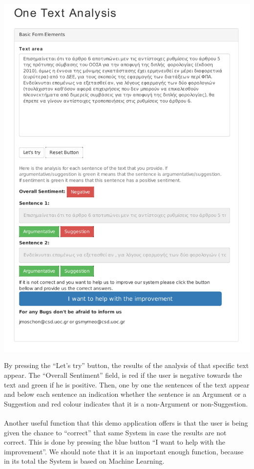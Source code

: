 \centerline{\includegraphics[width=0.9\linewidth]{figure/screens/screen2_vector.pdf}}

By pressing the ``Let's try'' button, the results of the analysis of that specific text appear. The ``Overall Sentiment'' field, is red if the user is negative towards the text and green if he is positive. Then, one by one the sentences of the text appear and below each sentence  an indication whether the sentence is an Argument or a Suggestion and red colour indicates that it is a non-Argument or non-Suggestion.\\
\\
Another useful function that this demo application offers is that the user is being given the chance to ``correct'' that same System in case the results are not correct. This is done by pressing the blue button ``I want to help with the improvement''. We should note that it is an important enough function, because in its total the System is based on Machine Learning.\\
\\

